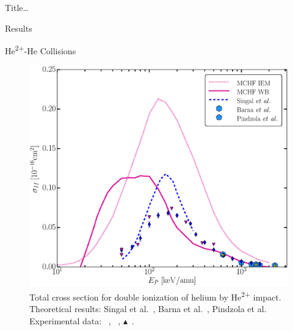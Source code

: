 \documentclass[letterpaper, 10 pt]{report}
\begin{document}
\begin{chapter}{ Title\dots \label{chap:p-he2p-he}}
\begin{section}{Results \label{sec:phe2p-res}}
\begin{subsection}{\texorpdfstring{He\textsuperscript{2+}}{He2+}-He Collisions 
                         \label{sec:he2phe-res}}
\begin{figure}[ht]
\begin{minipage}{.49\linewidth}
               \centering
               \includegraphics[width = \linewidth]{./images/he2phe/he2phe-II.eps}
               \caption[Total cross section for double ionization of helium by He\textsuperscript{2+}
                        impact.]{Total cross section for double ionization of helium by
                        He\textsuperscript{2+} impact. Theoretical results: Singal
                        et al.~\cite{SL-91}, Barna
                        et al.~\cite{BTB-05}, Pindzola et al.~\cite{PRC-07}
                        Experimental data: {\color{blue}{$\blacklozenge$}}~\cite{SG85},
                        {\color{RedViolet}{$\blacktriangledown$}}~\cite{Dubois87},
                        {\color{GreenYellow}$\blacktriangle$}~\cite{KAH84}. \label{fig:he2phe-ii}}
            \end{minipage}
         \end{figure}

         \begin{figure}[ht]
            \begin{minipage}{.49\linewidth}
 

\end{minipage}
\end{figure}
\end{subsection}
\end{section}
\end{chapter}
\end{document}
